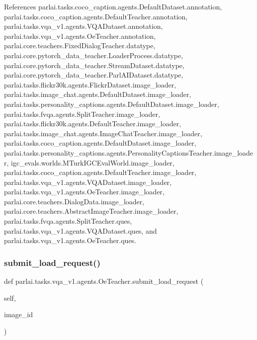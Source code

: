 References parlai.\+tasks.\+coco\+\_\+caption.\+agents.\+Default\+Dataset.\+annotation, parlai.\+tasks.\+coco\+\_\+caption.\+agents.\+Default\+Teacher.\+annotation, parlai.\+tasks.\+vqa\+\_\+v1.\+agents.\+V\+Q\+A\+Dataset.\+annotation, parlai.\+tasks.\+vqa\+\_\+v1.\+agents.\+Oe\+Teacher.\+annotation, parlai.\+core.\+teachers.\+Fixed\+Dialog\+Teacher.\+datatype, parlai.\+core.\+pytorch\+\_\+data\+\_\+teacher.\+Loader\+Process.\+datatype, parlai.\+core.\+pytorch\+\_\+data\+\_\+teacher.\+Stream\+Dataset.\+datatype, parlai.\+core.\+pytorch\+\_\+data\+\_\+teacher.\+Parl\+A\+I\+Dataset.\+datatype, parlai.\+tasks.\+flickr30k.\+agents.\+Flickr\+Dataset.\+image\+\_\+loader, parlai.\+tasks.\+image\+\_\+chat.\+agents.\+Default\+Dataset.\+image\+\_\+loader, parlai.\+tasks.\+personality\+\_\+captions.\+agents.\+Default\+Dataset.\+image\+\_\+loader, parlai.\+tasks.\+fvqa.\+agents.\+Split\+Teacher.\+image\+\_\+loader, parlai.\+tasks.\+flickr30k.\+agents.\+Default\+Teacher.\+image\+\_\+loader, parlai.\+tasks.\+image\+\_\+chat.\+agents.\+Image\+Chat\+Teacher.\+image\+\_\+loader, parlai.\+tasks.\+coco\+\_\+caption.\+agents.\+Default\+Dataset.\+image\+\_\+loader, parlai.\+tasks.\+personality\+\_\+captions.\+agents.\+Personality\+Captions\+Teacher.\+image\+\_\+loader, igc\+\_\+evals.\+worlds.\+M\+Turk\+I\+G\+C\+Eval\+World.\+image\+\_\+loader, parlai.\+tasks.\+coco\+\_\+caption.\+agents.\+Default\+Teacher.\+image\+\_\+loader, parlai.\+tasks.\+vqa\+\_\+v1.\+agents.\+V\+Q\+A\+Dataset.\+image\+\_\+loader, parlai.\+tasks.\+vqa\+\_\+v1.\+agents.\+Oe\+Teacher.\+image\+\_\+loader, parlai.\+core.\+teachers.\+Dialog\+Data.\+image\+\_\+loader, parlai.\+core.\+teachers.\+Abstract\+Image\+Teacher.\+image\+\_\+loader, parlai.\+tasks.\+fvqa.\+agents.\+Split\+Teacher.\+ques, parlai.\+tasks.\+vqa\+\_\+v1.\+agents.\+V\+Q\+A\+Dataset.\+ques, and parlai.\+tasks.\+vqa\+\_\+v1.\+agents.\+Oe\+Teacher.\+ques.

\mbox{\label{classparlai_1_1tasks_1_1vqa__v1_1_1agents_1_1OeTeacher_aed7f88bcef1e901e87d0a947d180586f}} 
\subsubsection{\texorpdfstring{submit\+\_\+load\+\_\+request()}{submit\_load\_request()}}
{\footnotesize\ttfamily def parlai.\+tasks.\+vqa\+\_\+v1.\+agents.\+Oe\+Teacher.\+submit\+\_\+load\+\_\+request (\begin{DoxyParamCaption}\item[{}]{self,  }\item[{}]{image\+\_\+id }\end{DoxyParamCaption})}



